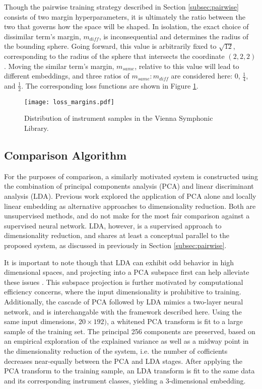 Though the pairwise training strategy described in Section \ref{subsec:pairwise} consists of two margin hyperparameters, it is ultimately the ratio between the two that governs how the space will be shaped.
In isolation, the exact choice of dissimilar term's margin, $m_{diff}$, is inconsequential and determines the radius of the bounding sphere.
Going forward, this value is arbitrarily fixed to $\sqrt{12}$, corresponding to the radius of the sphere that intersects the coordinate $(2, 2, 2)$.
Moving the similar term's margin, $m_{same}$, relative to this value will lead to different embeddings, and three ratios of $m_{same}:m_{diff}$ are considered here: 0, $\frac{1}{4}$, and $\frac{1}{2}$.
The corresponding loss functions are shown in Figure \ref{fig:margins}.


\begin{figure}[h]
\centering
\texttt{[image: loss\_margins.pdf]}
\caption{Distribution of instrument samples in the Vienna Symphonic Library.}
\label{fig:margins}
\end{figure}



\subsection{Comparison Algorithm}

For the purposes of comparison, a similarly motivated system is constructed using the combination of principal components analysis (PCA) and linear discriminant analysis (LDA).
Previous work explored the application of PCA alone and locally linear embedding as alternative approaches to dimensionality reduction.
Both are unsupervised methods, and do not make for the most fair comparison against a supervised neural network.
LDA, however, is a supervised approach to dimensionality reduction, and shares at least a conceptual parallel to the proposed system, as discussed in previously in Section \ref{subsec:pairwise}.

It is important to note though that LDA can exhibit odd behavior in high dimensional spaces, and projecting into a PCA subspace first can help alleviate these issues \cite{PCASubspace?}.
This subspace projection is further motivated by computational efficiency concerns, where the input dimensionality is prohibitive to training.
Additionally, the cascade of PCA followed by LDA mimics a two-layer neural network, and is interchangable with the framework described here.
Using the same input dimensions, $20\times192)$, a whitened PCA transform is fit to a large sample of the training set.
The principal 256 components are preserved, based on an empirical exploration of the explained variance as well as a midway point in the dimensionality reduction of the system, i.e. the number of cofficients decreases near-equally between the PCA and LDA stages.
After applying the PCA transform to the training sample, an LDA transform is fit to the same data and its corresponding instrument classes, yielding a 3-dimensional embedding.


